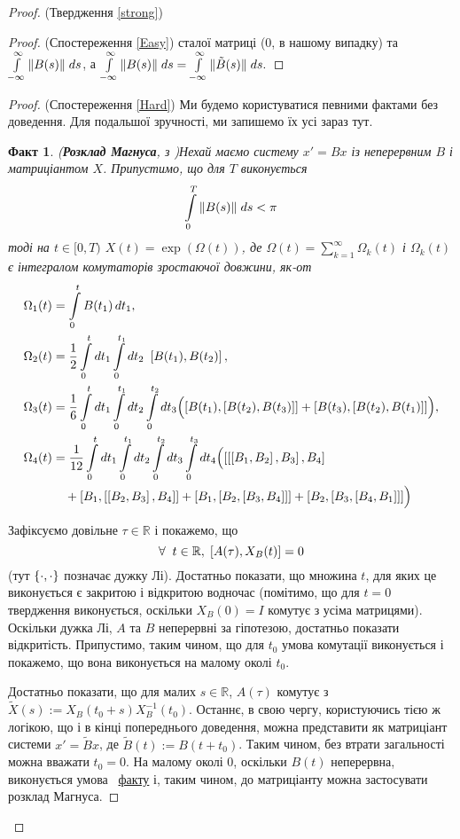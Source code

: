 \documentclass[14pt]{extarticle} %
\let\oldforall\forall
\renewcommand{\forall}{\oldforall\;}
\newtheorem*{fact}{Факт}
\theoremstyle{remark}
\begin{document}
\begin{proof}{(Твердження \ref{strong})}
\begin{proof}{(Спостереження \ref{Easy})}
	сталої матриці (0, в нашому випадку) та $\int_{-\infty}^\infty\mynorm{B(s)}\;ds$, а $\int_{-\infty}^\infty\mynorm{B(s)}\;ds=
	\int_{-\infty}^\infty\mynorm{\tilde{B}(s)}\;ds.$
\end{proof}
\begin{proof}{(Спостереження \ref{Hard})}
	Ми будемо користуватися певними фактами без доведення. Для подальшої зручності, ми запишемо їх усі зараз тут.
	\begin{fact}{(\textbf{Розклад Магнуса},
		з \cite{moan})}\label{MagnusConvergenceFact}
		Нехай маємо систему $x'=Bx$ із неперервним $B$ і матриціантом $X$. Припустимо, що для $T$ виконується
		\[\int_0^T\mynorm{B(s)}\;ds<\pi\]
		тоді на $t\in[0,T)$ $X(t)=\exp(\Omega(t))$, де $\Omega(t)=\sum\limits_{k=1}^\infty\Omega_k(t)$ і $\Omega_k(t)$ є інтегралом 
		комутаторів зростаючої довжини, як-от
		\begin{align*}
		\Omega_1(t) &= \int_0^t B(t_1)\,dt_1, \\
		\Omega_2(t) &= \frac{1}{2}\int_0^t dt_1 \int_0^{t_1} dt_2\ \left[  B(t_1),B(t_2)\right], \\
		\Omega_3(t) &= \frac{1}{6} \int_0^t dt_1 \int_0^{t_1}d t_2 \int_0^{t_2} dt_3
		\Bigl(\left[B(t_1),\left[B(t_2),B(t_3)\right]\right]+\left[B(t_3),\left[  B(t_2),B(t_{1})\right]\right]\Bigr), \\
		\Omega_4(t) &= \frac{1}{12} \int_0^t dt_1 \int_0^{t_1}d t_2 \int_0^{t_2} dt_3 \int_0^{t_3} dt_4
		\Bigl(\left[\left[\left[B_1,B_2\right],B_3\right],B_4\right] \\
		&\quad+\left[B_1,\left[\left[B_2,B_3\right],B_4\right]\right]
		+\left[B_1,\left[B_2,\left[B_3,B_4\right]\right]\right]
		+\left[B_2,\left[B_3,\left[B_4,B_1\right]\right]\right]\Bigr)
		\end{align*}
	\end{fact}
	Зафіксуємо довільне $\tau\in\mathbb{R}$ і покажемо, що
	\[\forall t\in\mathbb{R},\;\mysbra{A(\tau),X_B(t)}=0\]
	(тут $\left\{\cdot,\cdot\right\}$ позначає дужку Лі). Достатньо показати, що множина $t$, для яких це виконується є закритою і відкритою
	водночас (помітимо, що для $t=0$ твердження виконується, оскільки $X_B(0)=I$ комутує з усіма матрицями).
	Оскільки дужка Лі, $A$ та $B$ неперервні за гіпотезою, достатньо показати відкритість. Припустимо, таким чином, що для $t_0$ умова 
	комутації виконується і покажемо, що вона виконується на малому околі $t_0$.

	Достатньо показати, що для малих $s\in\mathbb{R}$, $A(\tau)$ комутує з $\tilde{X}(s):=X_B(t_0+s)X_B^{-1}(t_0)$. Останнє, в свою чергу,
	користуючись тією ж логікою, що і в кінці попереднього доведення, можна представити як матриціант системи $x'=\tilde{B}x$, де
	$\tilde{B}(t):=B(t+t_0)$. Таким чином, без втрати загальності можна вважати $t_0=0$. На малому околі 0, оскільки $B(t)$ неперервна,
	виконується умова ~\hyperref[MagnusConvergenceFact]{факту} і, таким чином, до матриціанту можна застосувати розклад Магнуса. 
	

\end{proof}
\end{proof}
\end{document}
